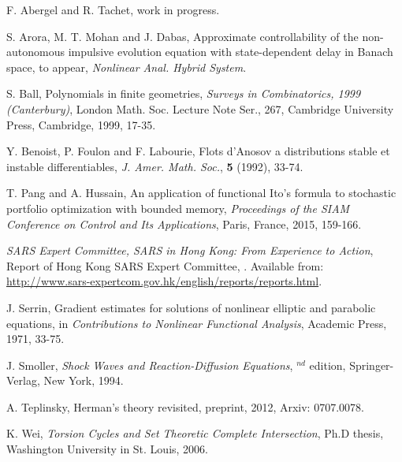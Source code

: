 \documentclass{main}
\begin{document}


\begin{thebibliography}{99}

\newblock F. Abergel and R. Tachet,
\newblock
\newblock work in progress.

\newblock S. Arora, M. T. Mohan and J. Dabas,
\newblock Approximate controllability of the non-autonomous impulsive evolution equation with state-dependent delay in Banach space,
\newblock to appear, \emph{Nonlinear Anal. Hybrid System}.

\newblock S. Ball,
\newblock Polynomials in finite geometries,
\newblock \emph{Surveys in Combinatorics, 1999 (Canterbury)}, London Math. Soc. Lecture Note Ser., 267, Cambridge University Press, Cambridge, 1999, 17-35.

\newblock Y. Benoist, P. Foulon and F. Labourie,
\newblock \textsf{Flots d'Anosov a distributions stable et instable differentiables},
\newblock \emph{J. Amer. Math. Soc.}, \textbf{5} (1992), 33-74.

\newblock T. Pang and A. Hussain,
\newblock \textsf{An application of functional Ito's formula to stochastic portfolio optimization with bounded memory},
\newblock \emph{Proceedings of the SIAM Conference on Control and Its Applications}, Paris, France, 2015, 159-166.

\newblock \emph{SARS Expert Committee, SARS in Hong Kong: From Experience to Action}, Report of Hong Kong SARS Expert Committee,
. Available from: \url{http://www.sars-expertcom.gov.hk/english/reports/reports.html}.

\newblock J. Serrin,
\newblock Gradient estimates for solutions of nonlinear elliptic and parabolic equations,
\newblock in \emph{Contributions to Nonlinear Functional Analysis}, Academic Press, 1971, 33-75.

\newblock J. Smoller,
\newblock \emph{Shock Waves and Reaction-Diffusion Equations},
$^{nd}$ edition, Springer-Verlag, New York, 1994.

\newblock A. Teplinsky,
\newblock Herman's theory revisited,
\newblock preprint, 2012, Arxiv: 0707.0078.

\newblock K. Wei,
\newblock \emph{Torsion Cycles and Set Theoretic Complete Intersection},
\newblock Ph.D thesis, Washington University in St. Louis, 2006.

\end{thebibliography}
\medskip
\end{document}
